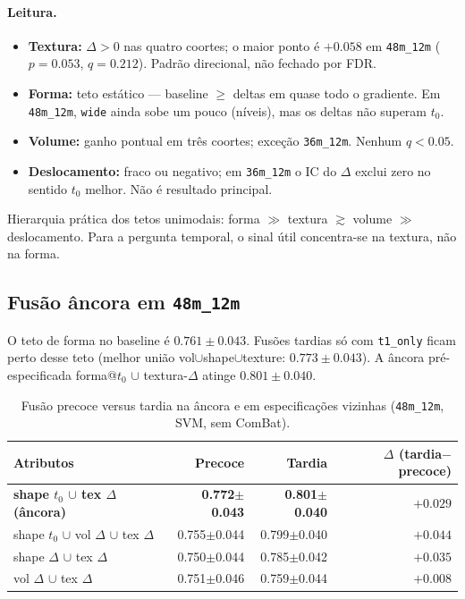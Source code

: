 \documentclass[review]{elsarticle}
\newcommand{\code}[1]{\texttt{#1}}
\begin{document}
	\paragraph{Leitura.}
	\begin{itemize}
		\item \textbf{Textura:} $\Delta>0$ nas quatro coortes; o maior ponto é $+0.058$ em \code{48m\_12m} ($p=0.053$, $q=0.212$). Padrão direcional, não fechado por FDR.
		\item \textbf{Forma:} teto estático --- baseline $\ge$ deltas em quase todo o gradiente. Em \code{48m\_12m}, \code{wide} ainda sobe um pouco (níveis), mas os deltas não superam $t_0$.
		\item \textbf{Volume:} ganho pontual em três coortes; exceção \code{36m\_12m}. Nenhum $q<0.05$.
		\item \textbf{Deslocamento:} fraco ou negativo; em \code{36m\_12m} o IC do $\Delta$ exclui zero no sentido $t_0$ melhor. Não é resultado principal.
	\end{itemize}
	Hierarquia prática dos tetos unimodais: forma $\gg$ textura $\gtrsim$ volume $\gg$ deslocamento.
	Para a pergunta temporal, o sinal útil concentra-se na textura, não na forma.
	
	\subsection{Fusão âncora em \texorpdfstring{\code{48m\_12m}}{48m\_12m}}
	\label{subsec:multimodal}
	
	O teto de forma no baseline é $0.761\pm0.043$.
	Fusões tardias só com \code{t1\_only} ficam perto desse teto (melhor união vol$\cup$shape$\cup$texture: $0.773\pm0.043$).
	A âncora pré-especificada forma@$t_0$ $\cup$ textura-$\Delta$ atinge $0.801\pm0.040$.
	
	\begin{table}[htbp]
		\centering
		\caption{Fusão precoce versus tardia na âncora e em especificações vizinhas (\code{48m\_12m}, SVM, sem ComBat).}
		\label{tab:early_late}
		\begin{tabular}{lrrr}
			\toprule
			Atributos & Precoce & Tardia & $\Delta$ (tardia$-$precoce) \\
			\midrule
			\textbf{shape $t_0$ $\cup$ tex $\Delta$ (âncora)} & \textbf{0.772$\pm$0.043} & \textbf{0.801$\pm$0.040} & \textbf{$+0.029$} \\
			shape $t_0$ $\cup$ vol $\Delta$ $\cup$ tex $\Delta$ & 0.755$\pm$0.044 & 0.799$\pm$0.040 & $+0.044$ \\
			shape $\Delta$ $\cup$ tex $\Delta$ & 0.750$\pm$0.044 & 0.785$\pm$0.042 & $+0.035$ \\
			vol $\Delta$ $\cup$ tex $\Delta$ & 0.751$\pm$0.046 & 0.759$\pm$0.044 & $+0.008$ \\
			\bottomrule
		\end{tabular}
	\end{table}
	
\end{document}
